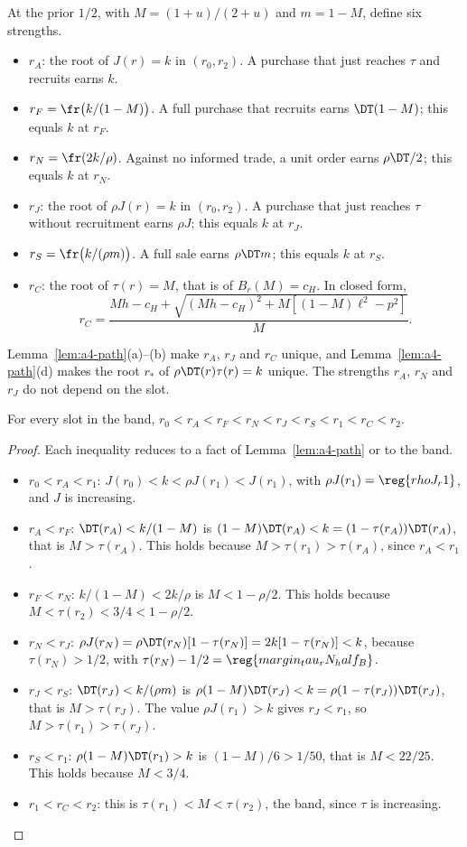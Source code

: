 At the prior \(1/2\), with \(M=(1+u)/(2+u)\) and \(m=1-M\), define six strengths.
\begin{itemize}[leftmargin=2em]
\item \(r_A\): the root of \(J(r)=k\) in \((r_0,r_2)\). A purchase that just reaches \(\tau\) and recruits earns
\(k\).
\item \(r_F=\fr\bigl(k/(1-M)\bigr)\). A full purchase that recruits earns \(\DT(1-M)\); this equals \(k\) at
\(r_F\).
\item \(r_N=\fr(2k/\rho)\). Against no informed trade, a unit order earns \(\rho\DT/2\); this equals \(k\) at
\(r_N\).
\item \(r_J\): the root of \(\rho J(r)=k\) in \((r_0,r_2)\). A purchase that just reaches \(\tau\) without
recruitment earns \(\rho J\); this equals \(k\) at \(r_J\).
\item \(r_S=\fr\bigl(k/(\rho m)\bigr)\). A full sale earns \(\rho\DT m\); this equals \(k\) at \(r_S\).
\item \(r_C\): the root of \(\tau(r)=M\), that is of \(B_r(M)=c_H\). In closed form,
\[
r_C=\frac{Mh-c_H+\sqrt{(Mh-c_H)^2+M[(1-M)\ell^2-p^2]}}{M}.
\]
\end{itemize}
Lemma~\ref{lem:a4-path}(a)--(b) make \(r_A\), \(r_J\) and \(r_C\) unique, and Lemma~\ref{lem:a4-path}(d) makes the root
\(r_*\) of \(\rho\DT(r)\tau(r)=k\) unique. The strengths \(r_A\), \(r_N\) and
\(r_J\) do not depend on the slot.

\begin{lemma}\label{lem:a4-order}
For every slot in the band, \(r_0<r_A<r_F<r_N<r_J<r_S<r_1<r_C<r_2\).
\end{lemma}

\begin{proof}
Each inequality reduces to a fact of Lemma~\ref{lem:a4-path} or to the band.
\begin{itemize}[leftmargin=2em]
\item \(r_0<r_A<r_1\): \(J(r_0)<k<\rho J(r_1)<J(r_1)\), with \(\rho J(r_1)=\reg{rhoJ_r1}\), and \(J\) is
increasing.
\item \(r_A<r_F\): \(\DT(r_A)<k/(1-M)\) is \((1-M)\DT(r_A)<k=(1-\tau(r_A))\DT(r_A)\), that is \(M>\tau(r_A)\).
This holds because \(M>\tau(r_1)>\tau(r_A)\), since \(r_A<r_1\).
\item \(r_F<r_N\): \(k/(1-M)<2k/\rho\) is \(M<1-\rho/2\). This holds because \(M<\tau(r_2)<3/4<1-\rho/2\).
\item \(r_N<r_J\): \(\rho J(r_N)=\rho\DT(r_N)[1-\tau(r_N)]=2k[1-\tau(r_N)]<k\), because \(\tau(r_N)>1/2\), with
\(\tau(r_N)-1/2=\reg{margin_tau_rN_half_B}\).
\item \(r_J<r_S\): \(\DT(r_J)<k/(\rho m)\) is \(\rho(1-M)\DT(r_J)<k=\rho(1-\tau(r_J))\DT(r_J)\), that is
\(M>\tau(r_J)\). The value \(\rho J(r_1)>k\) gives \(r_J<r_1\), so \(M>\tau(r_1)>\tau(r_J)\).
\item \(r_S<r_1\): \(\rho(1-M)\DT(r_1)>k\) is \((1-M)/6>1/50\), that is \(M<22/25\). This holds because
\(M<3/4\).
\item \(r_1<r_C<r_2\): this is \(\tau(r_1)<M<\tau(r_2)\), the band, since \(\tau\) is increasing.\qedhere
\end{itemize}
\end{proof}

